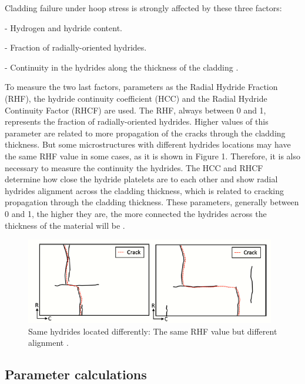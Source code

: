 \documentclass[12pt]{article}
\begin{document}
\noindent
Cladding failure under hoop stress is strongly  affected by these three factors:

\vspace{0.1 mm}
- Hydrogen and hydride content.

\vspace{0.1 mm}
- Fraction of radially-oriented hydrides.

\vspace{0.1 mm}
- Continuity in the hydrides along the thickness of the cladding \cite{SIMON2021152817}.

\noindent
To measure the two last factors, parameters as the Radial Hydride Fraction (RHF), the hydride continuity coefficient (HCC) and the Radial Hydride Continuity Factor (RHCF) are used. The RHF, always between 0 and 1, represents the fraction of radially-oriented hydrides. Higher values of this parameter are related to more propagation of the cracks through the cladding thickness. But some microstructures with different hydrides locations may have the same RHF value in some cases, as it is shown in Figure 1. Therefore, it is also necessary to measure the continuity the hydrides. The HCC and RHCF determine how close the hydride platelets are to each other and show radial hydrides alignment across the cladding thickness, which is related to cracking propagation through the cladding thickness. These parameters, generally between 0 and 1, the higher they are, the more connected the hydrides across the thickness of the material will be \cite{SIMON2021152817}.

\vspace{50 mm}

\begin{figure}[h] %
    \centering
    \includegraphics[width=4.3in]{same RHF.png}
    \caption{Same hydrides located differently: The same RHF value but different alignment \cite{SIMON2021152817}.}
    \label{fig:my_label}
\end{figure}

\subsection{Parameter calculations}
\end{document}
